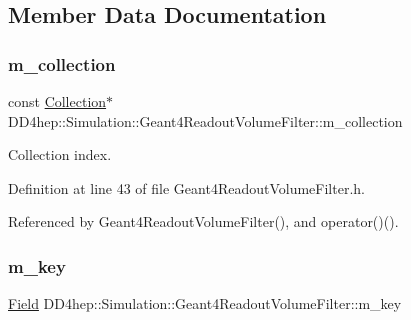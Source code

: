 \subsection{Member Data Documentation}
\hypertarget{class_d_d4hep_1_1_simulation_1_1_geant4_readout_volume_filter_ab38d8bb4c3c84b5e71af194dc2e9c060}{}\label{class_d_d4hep_1_1_simulation_1_1_geant4_readout_volume_filter_ab38d8bb4c3c84b5e71af194dc2e9c060} 
\subsubsection{\texorpdfstring{m\+\_\+collection}{m\_collection}}
{\footnotesize\ttfamily const \hyperlink{class_d_d4hep_1_1_simulation_1_1_geant4_readout_volume_filter_a8a5e97e2736eb07d0d98f3300ca4b61d}{Collection}$\ast$ D\+D4hep\+::\+Simulation\+::\+Geant4\+Readout\+Volume\+Filter\+::m\+\_\+collection\hspace{0.3cm}{\ttfamily [protected]}}



Collection index. 



Definition at line 43 of file Geant4\+Readout\+Volume\+Filter.\+h.



Referenced by Geant4\+Readout\+Volume\+Filter(), and operator()().

\hypertarget{class_d_d4hep_1_1_simulation_1_1_geant4_readout_volume_filter_a56f36107494374152415b45a635d4030}{}\label{class_d_d4hep_1_1_simulation_1_1_geant4_readout_volume_filter_a56f36107494374152415b45a635d4030} 
\subsubsection{\texorpdfstring{m\+\_\+key}{m\_key}}
{\footnotesize\ttfamily \hyperlink{class_d_d4hep_1_1_simulation_1_1_geant4_readout_volume_filter_a6b5e464fd34617d118c15b917c9094fa}{Field} D\+D4hep\+::\+Simulation\+::\+Geant4\+Readout\+Volume\+Filter\+::m\+\_\+key\hspace{0.3cm}{\ttfamily [protected]}}



